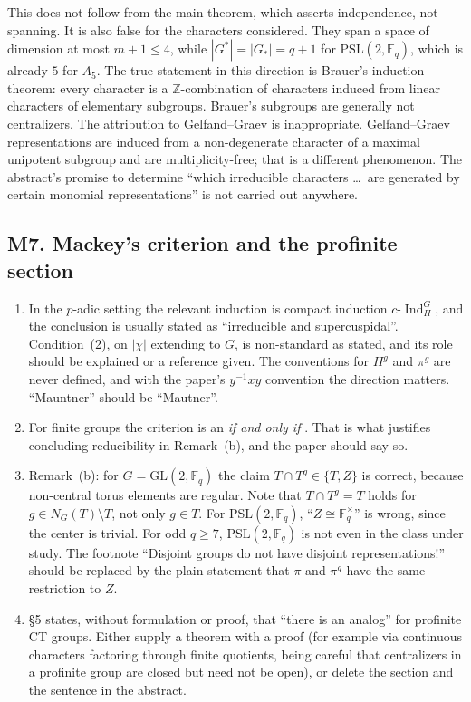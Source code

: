 \documentclass[12pt,letterpaper]{article}
\newcommand{\F}{\mathbb{F}}
\newcommand{\Z}{\mathbb{Z}}
\newcommand{\Ind}{\operatorname{Ind}}
\newcommand{\PSL}{\mathrm{PSL}}
\newcommand{\GL}{\mathrm{GL}}
\theoremstyle{definition}
\begin{document}
This does not follow from the main theorem, which asserts independence,
not spanning. It is also false for the characters considered. They span
a space of dimension at most $m+1\le4$, while $|G^*|=|G_*|=q+1$ for
$\PSL(2,\F_q)$, which is already $5$ for $A_5$. The true statement in
this direction is Brauer's induction theorem: every character is a
$\Z$-combination of characters induced from linear characters of
elementary subgroups. Brauer's subgroups are generally not centralizers.
The attribution to Gelfand--Graev is inappropriate. Gelfand--Graev
representations are induced from a non-degenerate character of a
maximal unipotent subgroup and are multiplicity-free; that is a
different phenomenon. The abstract's promise to determine ``which
irreducible characters \dots\ are generated by certain monomial
representations'' is not carried out anywhere.

\subsection*{M7. Mackey's criterion and the profinite section}

\begin{enumerate}[label=(\alph*),itemsep=1pt]
\item In the $p$-adic setting the relevant induction is compact
  induction $c\text{-}\Ind_H^G$, and the conclusion is usually stated as
  ``irreducible and supercuspidal''. Condition~(2), on $|\chi|$
  extending to $G$, is non-standard as stated, and its role should be
  explained or a reference given. The conventions for $H^g$ and $\pi^g$
  are never defined, and with the paper's $y^{-1}xy$ convention the
  direction matters. ``Mauntner'' should be ``Mautner''.
\item For finite groups the criterion is an \emph{if and only if}
  \cite[\S7.4, Prop.~23]{Se}. That is what justifies concluding
  reducibility in Remark~(b), and the paper should say so.
\item Remark~(b): for $G=\GL(2,\F_q)$ the claim $T\cap T^g\in\{T,Z\}$
  is correct, because non-central torus elements are regular. Note that
  $T\cap T^g=T$ holds for $g\in N_G(T)\setminus T$, not only $g\in T$.
  For $\PSL(2,\F_q)$, ``$Z\cong\F_q^\times$'' is wrong, since the center
  is trivial. For odd $q\ge7$, $\PSL(2,\F_q)$ is not even in the class
  under study. The footnote ``Disjoint groups do not have disjoint
  representations!'' should be replaced by the plain statement that
  $\pi$ and $\pi^g$ have the same restriction to $Z$.
\item \S5 states, without formulation or proof, that ``there is an
  analog'' for profinite CT groups. Either supply a theorem with a proof
  (for example via continuous characters factoring through finite
  quotients, being careful that centralizers in a profinite group are
  closed but need not be open), or delete the section and the sentence
  in the abstract.
\end{enumerate}
\end{document}

